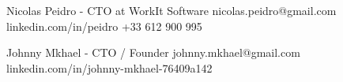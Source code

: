 

\cvref
    {Nicolas Peidro - CTO at WorkIt Software}
    {nicolas.peidro@gmail.com}
    {linkedin.com/in/peidro}
    {+33 612 900 995}

\divider

\cvref
    {Johnny Mkhael - CTO / Founder}
    {johnny.mkhael@gmail.com}
    {linkedin.com/in/johnny-mkhael-76409a142}
    {}
